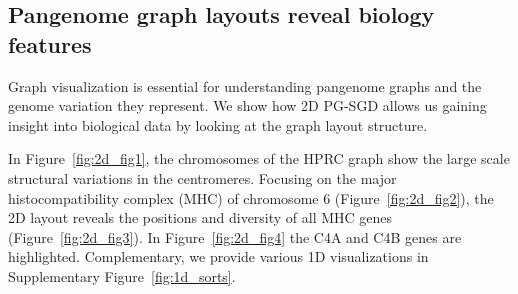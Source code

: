 \documentclass{bioinfo}
\theoremstyle{definition}
\begin{document}
    \subsection{Pangenome graph layouts reveal biology features}
	Graph visualization is essential for understanding pangenome graphs and the genome variation they represent. 
	We show how 2D PG-SGD allows us gaining insight into biological data by looking at the graph layout structure. 
			
	In Figure~\ref{fig:2d_fig1}, the chromosomes of the HPRC graph show the large scale structural variations in the centromeres.
	Focusing on the major histocompatibility complex (MHC) of chromosome 6 (Figure~\ref{fig:2d_fig2}), the 2D layout reveals the positions and diversity of all MHC genes (Figure~\ref{fig:2d_fig3}).
	In Figure~\ref{fig:2d_fig4} the C4A and C4B genes are highlighted. 
	Complementary, we provide various 1D visualizations in Supplementary Figure~\ref{fig:1d_sorts}.
\end{document}
